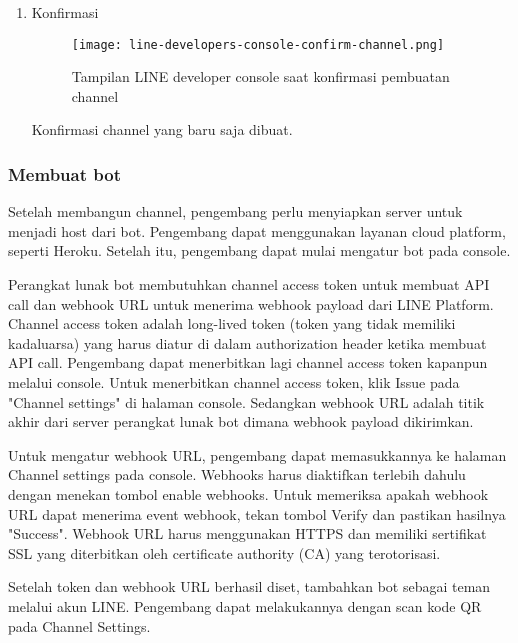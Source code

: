 \begin{enumerate}
\begin{itemize}
\end{itemize}

\item Konfirmasi
\begin{figure}[H]
	\centering  
	\texttt{[image: line-developers-console-confirm-channel.png]}  
	\caption[Tampilan LINE developer console saat konfirmasi pembuatan channel]{Tampilan LINE developer console saat konfirmasi pembuatan channel} 
	\label{fig:line-developers-console-confirm-channel} 
\end{figure}

Konfirmasi channel yang baru saja dibuat.

\end{enumerate}


\subsubsection{Membuat bot}
Setelah membangun channel, pengembang perlu menyiapkan server untuk menjadi host dari bot. Pengembang dapat menggunakan layanan cloud platform, seperti Heroku. Setelah itu, pengembang dapat mulai mengatur bot pada console.

Perangkat lunak bot membutuhkan channel access token untuk membuat API call dan webhook URL untuk menerima webhook payload dari LINE Platform. Channel access token adalah long-lived token (token yang tidak memiliki kadaluarsa) yang harus diatur di dalam authorization header ketika membuat API call. Pengembang dapat menerbitkan lagi channel access token kapanpun melalui console. Untuk menerbitkan channel access token, klik Issue pada "Channel settings" di halaman console. Sedangkan webhook URL adalah titik akhir dari server perangkat lunak bot dimana webhook payload dikirimkan.


Untuk mengatur webhook URL, pengembang dapat memasukkannya ke halaman Channel settings pada console. Webhooks harus diaktifkan terlebih dahulu dengan menekan tombol enable webhooks. Untuk memeriksa apakah webhook URL dapat menerima event webhook, tekan tombol Verify dan pastikan hasilnya "Success". Webhook URL harus menggunakan HTTPS dan memiliki sertifikat SSL yang diterbitkan oleh certificate authority (CA) yang terotorisasi.


Setelah token dan webhook URL berhasil diset, tambahkan bot sebagai teman melalui akun LINE. Pengembang dapat melakukannya dengan scan kode QR pada Channel Settings.

